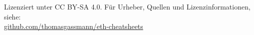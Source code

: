 \begin{center}
    Lizenziert unter CC BY-SA 4.0. Für Urheber, Quellen und Lizenzinformationen, siehe:\\
    \href{https://github.com/thomasgassmann/eth-cheatsheets}{github.com/thomasgassmann/eth-cheatsheets}
\end{center}
